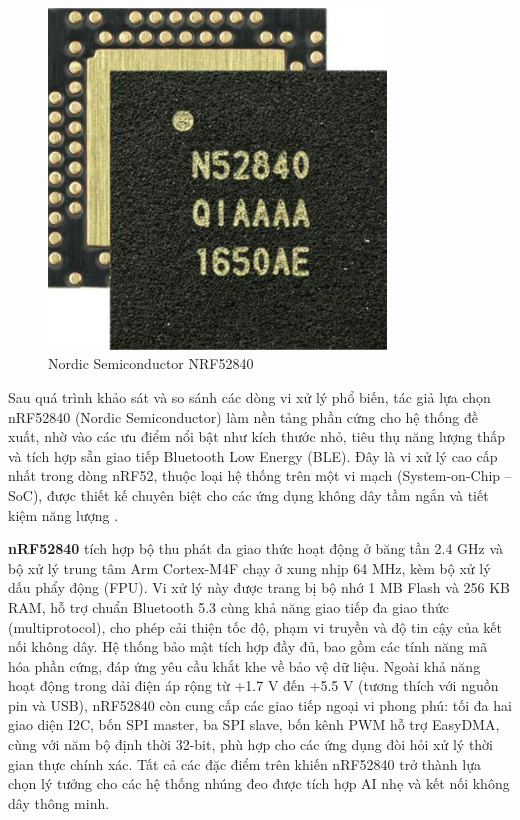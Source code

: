 \begin{figure}[!ht]
		\centering
 		\includegraphics[width=0.8\textwidth]{images/NRF52840-QFA_SPL.jpg}
		\caption{Nordic Semiconductor NRF52840}
		\label{lis}
\end{figure}
Sau quá trình khảo sát và so sánh các dòng vi xử lý phổ biến, tác giả 
lựa chọn nRF52840 (Nordic Semiconductor) làm nền tảng phần cứng cho hệ 
thống đề xuất, nhờ vào các ưu điểm nổi bật như kích thước nhỏ, 
tiêu thụ năng lượng thấp và tích hợp sẵn giao tiếp Bluetooth Low Energy 
(BLE). Đây là vi xử lý cao cấp nhất trong dòng nRF52, thuộc loại hệ thống 
trên một vi mạch (System-on-Chip – SoC), được thiết kế chuyên biệt cho 
các ứng dụng không dây tầm ngắn và tiết kiệm năng lượng \cite{nrf52840}.

\textbf{nRF52840} tích hợp bộ thu phát đa giao thức hoạt động ở băng tần 2.4 GHz 
và bộ xử lý trung tâm Arm Cortex-M4F chạy ở xung nhịp 64 MHz, 
kèm bộ xử lý dấu phẩy động (FPU). Vi xử lý này được trang bị bộ nhớ 
1 MB Flash và 256 KB RAM, hỗ trợ chuẩn Bluetooth 5.3 cùng khả năng giao 
tiếp đa giao thức (multiprotocol), cho phép cải thiện tốc độ, phạm vi 
truyền và độ tin cậy của kết nối không dây. Hệ thống bảo mật tích hợp 
đầy đủ, bao gồm các tính năng mã hóa phần cứng, đáp ứng yêu cầu khắt khe 
về bảo vệ dữ liệu. Ngoài khả năng hoạt động trong dải điện áp rộng 
từ +1.7 V đến +5.5 V (tương thích với nguồn pin và USB), nRF52840 còn 
cung cấp các giao tiếp ngoại vi phong phú: tối đa hai giao diện I2C, 
bốn SPI master, ba SPI slave, bốn kênh PWM hỗ trợ EasyDMA, cùng với 
năm bộ định thời 32-bit, phù hợp cho các ứng dụng đòi hỏi xử lý thời 
gian thực chính xác. Tất cả các đặc điểm trên khiến nRF52840 trở thành 
lựa chọn lý tưởng cho các hệ thống nhúng đeo được tích hợp AI nhẹ và 
kết nối không dây thông minh.

